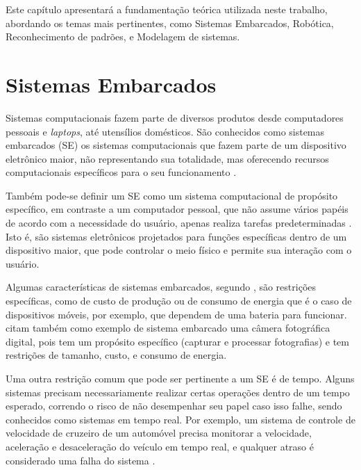 Este capítulo apresentará a fundamentação teórica utilizada neste trabalho, abordando os temas mais pertinentes, como Sistemas Embarcados, Robótica, Reconhecimento de padrões, e Modelagem de sistemas.

\section{Sistemas Embarcados}
\label{sec:embarcados}

Sistemas computacionais fazem parte de diversos produtos desde computadores pessoais e \textit{laptops}, até utensílios domésticos. São conhecidos como sistemas embarcados (SE) os sistemas computacionais que fazem parte de um dispositivo eletrônico maior, não representando sua totalidade, mas oferecendo recursos computacionais específicos para o seu funcionamento \cite{vahid:2002}.

Também pode-se definir um SE como um sistema computacional de propósito específico, em contraste a um computador pessoal, que não assume vários papéis de acordo com a necessidade do usuário, apenas realiza tarefas predeterminadas \cite{heath:2002}. Isto é, são sistemas eletrônicos projetados para funções específicas dentro de um dispositivo maior, que pode controlar o meio físico e permite sua interação com o usuário.

Algumas características de sistemas embarcados, segundo , são restrições específicas, como de custo de produção ou de consumo de energia que é o caso de dispositivos móveis, por exemplo, que dependem de uma bateria para funcionar.  citam também como exemplo de sistema embarcado uma câmera fotográfica digital, pois tem um propósito específico (capturar e processar fotografias) e tem restrições de tamanho, custo, e consumo de energia.

Uma outra restrição comum que pode ser pertinente a um SE é de tempo. Alguns sistemas precisam necessariamente realizar certas operações dentro de um tempo esperado, correndo o risco de não desempenhar seu papel caso isso falhe, sendo conhecidos como sistemas em tempo real. Por exemplo, um sistema de controle de velocidade de cruzeiro de um automóvel precisa monitorar a velocidade, aceleração e desaceleração do veículo em tempo real, e qualquer atraso é considerado uma falha do sistema \cite{vahid:2002}.


